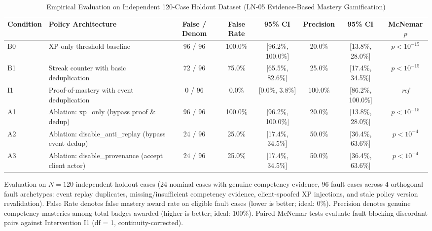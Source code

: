 \begin{table}[htbp]
\centering
\small
\caption{Empirical Evaluation on Independent 120-Case Holdout Dataset (LN-05 Evidence-Based Mastery Gamification)}
\label{tab:ln-05-holdout-benchmark}
\begin{tabular}{llcccccc}
\toprule
Condition & Policy Architecture & False / Denom & False Rate & 95\% CI & Precision & 95\% CI & McNemar $p$ \\
\midrule
B0 & XP-only threshold baseline & 96 / 96 & 100.0\% & [96.2\%, 100.0\%] & 20.0\% & [13.8\%, 28.0\%] & $p < 10^{-15}$ \\
B1 & Streak counter with basic deduplication & 72 / 96 & 75.0\% & [65.5\%, 82.6\%] & 25.0\% & [17.4\%, 34.5\%] & $p < 10^{-15}$ \\
I1 & Proof-of-mastery with event deduplication & 0 / 96 & 0.0\% & [0.0\%, 3.8\%] & 100.0\% & [86.2\%, 100.0\%] & \textit{ref} \\
A1 & Ablation: xp\_only (bypass proof \& dedup) & 96 / 96 & 100.0\% & [96.2\%, 100.0\%] & 20.0\% & [13.8\%, 28.0\%] & $p < 10^{-15}$ \\
A2 & Ablation: disable\_anti\_replay (bypass event dedup) & 24 / 96 & 25.0\% & [17.4\%, 34.5\%] & 50.0\% & [36.4\%, 63.6\%] & $p < 10^{-4}$ \\
A3 & Ablation: disable\_provenance (accept client actor) & 24 / 96 & 25.0\% & [17.4\%, 34.5\%] & 50.0\% & [36.4\%, 63.6\%] & $p < 10^{-4}$ \\
\bottomrule
\end{tabular}
\par\smallskip
\begin{minipage}{0.98\linewidth}\footnotesize
Evaluation on $N=120$ independent holdout cases (24 nominal cases with genuine competency evidence, 96 fault cases across 4 orthogonal fault archetypes: event replay duplicates, missing/insufficient competency evidence, client-spoofed XP injections, and stale policy version revalidation). False Rate denotes false mastery award rate on eligible fault cases (lower is better; ideal: 0\%). Precision denotes genuine competency masteries among total badges awarded (higher is better; ideal: 100\%). Paired McNemar tests evaluate fault blocking discordant pairs against Intervention I1 (df = 1, continuity-corrected).
\end{minipage}
\end{table}
